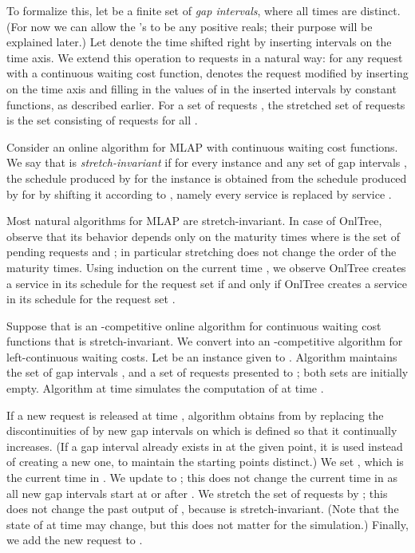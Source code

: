 \documentclass[a4paper]{article}
\newcommand{\OnAlgTreesGeneral}{{\sc OnlTree}}
\newcommand{\MLAP}{\mbox{\rm\textsf{MLAP}}}
\begin{document}
To formalize this, let 
be a finite set of \emph{gap intervals}, where all times  are distinct.
(For now we can allow the 's to be any positive reals; their purpose will
be explained later.)
Let  denote the time  shifted right by
inserting intervals  on the time axis. We extend this operation to
requests in a natural way: for any request  with a 
continuous waiting cost function,
 denotes the request modified by inserting 
on the time axis and filling in the values of  in the
inserted intervals by constant functions, as described earlier. For a set
of requests ,  the stretched set of requests
 is the set consisting of requests  for
all .

Consider an online algorithm  for {\MLAP} with
continuous waiting cost functions.
We say that  is {\em stretch-invariant} if for every instance  and any set of gap intervals , the
schedule produced by  for the instance
 is obtained from the schedule
produced by  for  by shifting it according to ,
namely every service  is
replaced by service .

Most natural algorithms for {\MLAP} are stretch-invariant. In case of
{\OnAlgTreesGeneral}, observe that its behavior depends only on the
maturity times  where  is the set of pending requests and
; in particular
stretching does not change the order of the maturity times. 
Using induction on the current time , we observe 
{\OnAlgTreesGeneral} creates a service  in its schedule for the request set 
if and only if
{\OnAlgTreesGeneral} creates a service  in its schedule
for the request set .

Suppose that  is an -competitive online
algorithm for continuous waiting cost functions that is stretch-invariant.  
We convert  into an
-competitive algorithm  for left-continuous waiting costs.
Let  be an instance given to .
Algorithm  maintains the set of gap intervals , and
a set of requests  presented to ; both sets are
initially empty.  Algorithm  at time  simulates the
computation of  at time .

If a new request  is released at time ,
algorithm  obtains  from  by
replacing the discontinuities of  by new gap intervals 
on which  is defined so that it continually
increases. (If a gap interval already exists in  at the
given point, it is used instead of creating a new one, to maintain the
starting points distinct.) We set
, which is the current time in . We update
 to ; this does not change the current
time in  as all  new gap intervals start at or after
.  We stretch the set of requests  by ; this
does not change the past output of , because  is
stretch-invariant. (Note that the state of  at time  may change, but
this does not matter for the simulation.)
Finally, we add the new request  to . 
\end{document}
